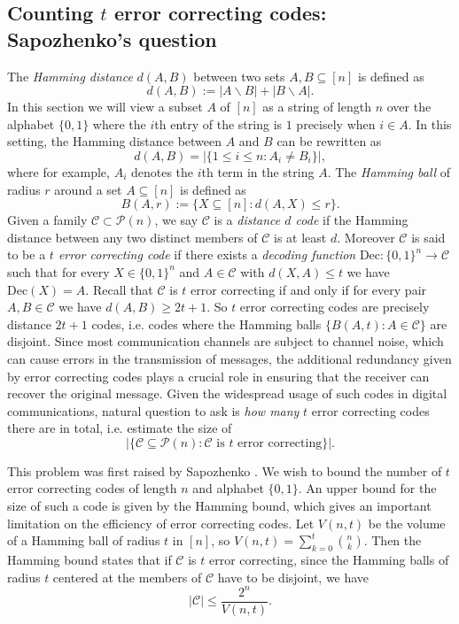 \documentclass[11pt]{article}
\numberwithin{equation}{section}
\begin{document}
\subsection{Counting $t$ error correcting codes: Sapozhenko's question}
\label{errorcodescountingsubsection}
The \emph{Hamming distance} $d(A,B)$ between two sets $A,B\subseteq [n]$ is defined as 
$$d(A,B):=|A\backslash B|+|B\backslash A|.$$ 
In this section we will view a subset $A$ of $[n]$ as a string of length $n$ over the alphabet $\{0,1\}$ where the $i$th entry of the string is $1$ precisely when $i \in A$. 
In this setting, the Hamming distance between $A$ and $B$ can be rewritten as $$d(A,B)=|\{1\leq i \leq n : A_i\ne B_i\}|,$$ where for example, $A_i$ denotes the $i$th term in the string $A$.
The \emph{Hamming ball} of radius $r$ around a set $A\subseteq [n]$ is defined as 
$$B(A,r):=\{X\subseteq [n] : d(A,X)\leq r\}.$$
Given a family $\mathcal{C}\subset \mathcal{P}(n)$, we say $\mathcal{C}$ is a \emph{distance $d$ code} if the Hamming distance between any two distinct members of $\mathcal{C}$ is at least $d$. Moreover $\mathcal{C}$ is said to be a \emph{$t$ error correcting code} if there exists a \emph{decoding function} $\text{Dec}:\{0,1\}^n\to\mathcal{C}$ such that for every $X\in\{0,1\}^n$ and $A\in\mathcal{C}$ with $d(X,A)\leq t$ we have $\text{Dec}(X)=A$. Recall that $\mathcal{C}$ is $t$ error correcting if and only if for every pair $A,B\in\mathcal{C}$ we have $d(A,B)\geq 2t+1$. So $t$ error correcting codes are precisely distance $2t+1$ codes, i.e. codes where the Hamming balls $\{B(A,t):A\in\mathcal{C}\}$ are disjoint.  Since most communication channels are subject to channel noise, which can cause errors in the transmission of messages, the additional redundancy given by error correcting codes plays a crucial role in ensuring that the receiver can recover the original message. Given the widespread usage of such codes in digital communications, natural question to ask is  \emph{how many}  $t$ error correcting codes there are in total, i.e. estimate the size of $$|\{\mathcal{C}\subseteq \mathcal{P}(n) : \mathcal{C} \text{ is } t \text{ error correcting}\}|.$$


This problem was first raised by Sapozhenko \cite{saponew}.
We wish to bound the number of $t$ error correcting codes of length $n$ and alphabet $\{0,1\}$. An upper bound for the size of such a code is given by the Hamming bound, which gives an important limitation on the efficiency of error correcting codes. Let $V(n,t)$ be the volume of a Hamming ball of radius $t$ in $[n]$, so $V(n,t)=\sum_{k=0}^t \binom{n}{k}$. Then the Hamming bound states that if $\mathcal{C}$ is $t$ error correcting,  since the Hamming balls of radius $t$ centered at the members of $\mathcal{C}$ have to be disjoint, we have $$|\mathcal{C}|\leq \frac{2^n}{V(n,t)}.$$
\end{document}
